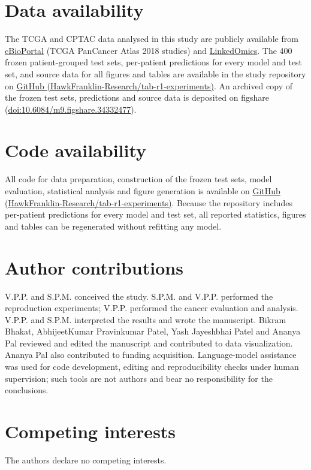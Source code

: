 \documentclass[pdflatex,sn-nature]{sn-jnl}
\begin{document}
\section*{Data availability}
The TCGA and CPTAC data analysed in this study are publicly available from \href{https://www.cbioportal.org}{cBioPortal} (TCGA PanCancer Atlas 2018 studies) and \href{https://www.linkedomics.org}{LinkedOmics}. The 400 frozen patient-grouped test sets, per-patient predictions for every model and test set, and source data for all figures and tables are available in the study repository on \href{https://github.com/HawkFranklin-Research/tab-r1-experiments}{GitHub (HawkFranklin-Research/tab-r1-experiments)}. An archived copy of the frozen test sets, predictions and source data is deposited on figshare (\href{https://doi.org/10.6084/m9.figshare.34332477}{doi:10.6084/m9.figshare.34332477}).

\section*{Code availability}
All code for data preparation, construction of the frozen test sets, model evaluation, statistical analysis and figure generation is available on \href{https://github.com/HawkFranklin-Research/tab-r1-experiments}{GitHub (HawkFranklin-Research/tab-r1-experiments)}. Because the repository includes per-patient predictions for every model and test set, all reported statistics, figures and tables can be regenerated without refitting any model.

\section*{Author contributions}
V.P.P. and S.P.M. conceived the study. S.P.M. and V.P.P. performed the reproduction experiments; V.P.P. performed the cancer evaluation and analysis. V.P.P. and S.P.M. interpreted the results and wrote the manuscript. Bikram Bhakat, AbhijeetKumar Pravinkumar Patel, Yash Jayeshbhai Patel and Ananya Pal reviewed and edited the manuscript and contributed to data visualization. Ananya Pal also contributed to funding acquisition. Language-model assistance was used for code development, editing and reproducibility checks under human supervision; such tools are not authors and bear no responsibility for the conclusions.

\section*{Competing interests}
The authors declare no competing interests.
\end{document}
